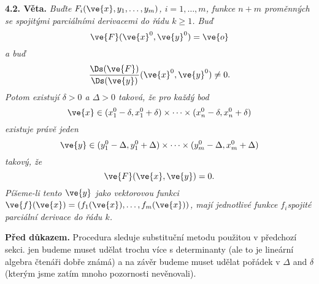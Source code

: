\documentclass[12pt]{article}
\begin{document}
{\bigskip


{\bf 4.2. Věta.} {\em Buďte $F_i(\ve{x},y_1,\dots,y_m)$, $i=1,\dots,m$, funkce
 $n+m$ proměnných se spojitými parciálními derivacemi do řádu $k\geq 1$. Buď
$$
\ve{F}(\ve{x}^0,\ve{y}^0)=\ve{o}
$$
a buď
$$
\frac{\Ds(\ve{F})}{\Ds(\ve{y})}(\ve{x}^0,\ve{y}^0)\neq 0.
$$
Potom existují $\delta>0$ a $\Delta>0$ taková, že pro každý bod
$$\ve{x}\in(x^0_1-\delta,x^0_1+\delta)\times\cdots\times(x^0_n-\delta,x^0_n+\delta)$$ 
existuje  právě jeden
$$\ve{y}\in(y^0_1-\Delta,y^0_1+\Delta)\times\cdots\times(y^0_m-\Delta,x^0_m+\Delta)$$ 
takový, že
$$\ve{F}(\ve{x},\ve{y})=0.$$ 
Píšeme-li tento $\ve{y}$ jako vektorovou funkci
 $\ve{f}(\ve{x})=(f_1(\ve{x}),\dots,f_m(\ve{x}))$, 
mají jednotlivé funkce $f_i$spojité parciální derivace do řádu $k$.}

\smallskip

{\bf Před důkazem.} Procedura sleduje substituční metodu použitou v předchozí sekci. jen budeme muset udělat trochu více s determinanty (ale to je lineární algebra čtenáři dobře známá) a na závěr
budeme muset udělat pořádek v
$\Delta$ and $\delta$ (kterým jsme zatím mnoho pozornosti nevěnovali).

\smallskip
 
}
\end{document}
